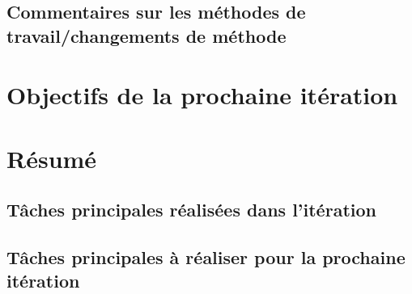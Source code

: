 \documentclass[12pt,titlepage,french]{article}
\begin{document}
\subsection{Commentaires sur les méthodes de travail/changements de méthode}


\section{Objectifs de la prochaine itération}


\section{Résumé}
\subsection{Tâches principales réalisées dans l'itération}

\subsection{Tâches principales à réaliser pour la prochaine itération}

\begin{thebibliography}{3}

\end{thebibliography}
\end{document}
